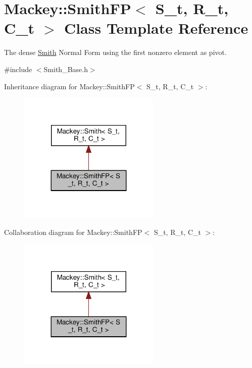 \hypertarget{classMackey_1_1SmithFP}{}\section{Mackey\+:\+:Smith\+FP$<$ S\+\_\+t, R\+\_\+t, C\+\_\+t $>$ Class Template Reference}
\label{classMackey_1_1SmithFP}


The dense \hyperlink{classMackey_1_1Smith}{Smith} Normal Form using the first nonzero element as pivot.  




{\ttfamily \#include $<$Smith\+\_\+\+Base.\+h$>$}



Inheritance diagram for Mackey\+:\+:Smith\+FP$<$ S\+\_\+t, R\+\_\+t, C\+\_\+t $>$\+:\nopagebreak
\begin{figure}[H]
\begin{center}
\leavevmode
\includegraphics[width=191pt]{classMackey_1_1SmithFP__inherit__graph}
\end{center}
\end{figure}


Collaboration diagram for Mackey\+:\+:Smith\+FP$<$ S\+\_\+t, R\+\_\+t, C\+\_\+t $>$\+:\nopagebreak
\begin{figure}[H]
\begin{center}
\leavevmode
\includegraphics[width=191pt]{classMackey_1_1SmithFP__coll__graph}
\end{center}
\end{figure}
